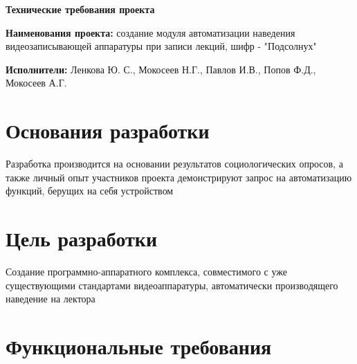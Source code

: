 



\begin{center}
    {\LARGE\bfseries Технические требования проекта} \\
    \vspace{0.5cm}
\end{center}

\begin{minipage}{0.85\linewidth - \parindent}
\textbf{Наименования проекта:} создание модуля автоматизации наведения видеозаписывающей аппаратуры при записи лекций, шифр - "Подсолнух"

\textbf{Исполнители:} Ленкова Ю. С., Мокосеев Н.Г., Павлов И.В., Попов Ф.Д., Мокосеев А.Г.
\end{minipage}

\section{Основания разработки}

Разработка производится на основании результатов социологических опросов, а также личный опыт участников проекта демонстрируют запрос на автоматизацию функций, берущих на себя устройством

\section{Цель разработки}

Создание программно-аппаратного комплекса, совместимого с уже существующими стандартами видеоаппаратуры, автоматически производящего наведение на лектора

\section{Функциональные требования}\label{func}

